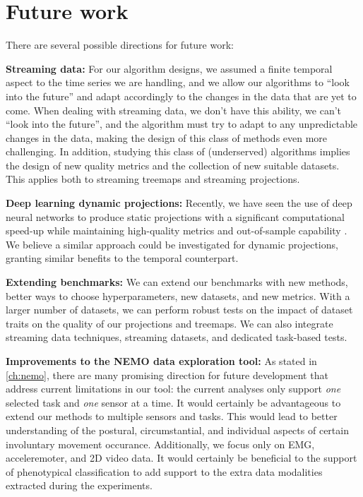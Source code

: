 \section{Future work}

There are several possible directions for future work:

\noindent\textbf{Streaming data:} For our algorithm designs, we assumed a finite temporal aspect to the time series we are handling, and we allow our algorithms to ``look into the future'' and adapt accordingly to the changes in the data that are yet to come. 
When dealing with streaming data, we don't have this ability, we can't ``look into the future'', and the algorithm must try to adapt to any unpredictable changes in the data, making the design of this class of methods even more challenging.
In addition, studying this class of (underserved) algorithms implies the design of new quality metrics and the collection of new suitable datasets. This applies both to streaming treemaps and streaming projections.

\noindent\textbf{Deep learning dynamic projections:} Recently, we have seen the use of deep neural networks to produce static projections with a significant computational speed-up while maintaining high-quality metrics and out-of-sample capability \citep{MateusEspadoto}. We believe a similar approach could be investigated for dynamic projections, granting similar benefits to the temporal counterpart.

\noindent\textbf{Extending benchmarks:} 
We can extend our benchmarks with new methods, better ways to choose hyperparameters, new datasets, and new metrics. With a larger number of datasets, we can perform robust tests on the impact of dataset traits on the quality of our projections and treemaps. We can also integrate streaming data techniques, streaming datasets, and dedicated task-based tests. 

\noindent\textbf{Improvements to the NEMO data exploration tool:} 
As stated in \cref{ch:nemo}, there are many promising direction for future development that address current limitations in our tool: the current analyses only support \emph{one} selected task and \emph{one} sensor at a time. It would certainly be advantageous to extend our methods to multiple sensors and tasks. This would lead to better understanding of the postural, circumstantial,  and individual aspects of certain involuntary movement occurance.
Additionally, we focus only on EMG, acceleremoter, and 2D video data. It would certainly be beneficial to the support of phenotypical classification to add support to the extra data modalities extracted during the experiments.


